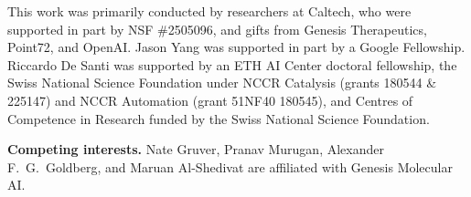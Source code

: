 \documentclass{article}
\begin{document}
\begin{ack}
This work was primarily conducted by researchers at Caltech, who were supported in part by NSF \#2505096, and gifts from Genesis Therapeutics, Point72, and OpenAI. Jason Yang was supported in part by a Google Fellowship. Riccardo De Santi was supported by an ETH AI Center doctoral fellowship, the Swiss
National Science Foundation under NCCR Catalysis (grants 180544 \& 225147) and NCCR Automation (grant 51NF40 180545), and Centres of Competence in Research funded by the Swiss National Science Foundation.

\textbf{Competing interests.} Nate Gruver, Pranav Murugan, Alexander F.~G.~Goldberg, and Maruan Al-Shedivat are affiliated with Genesis Molecular AI.
\end{ack}



\end{document}
